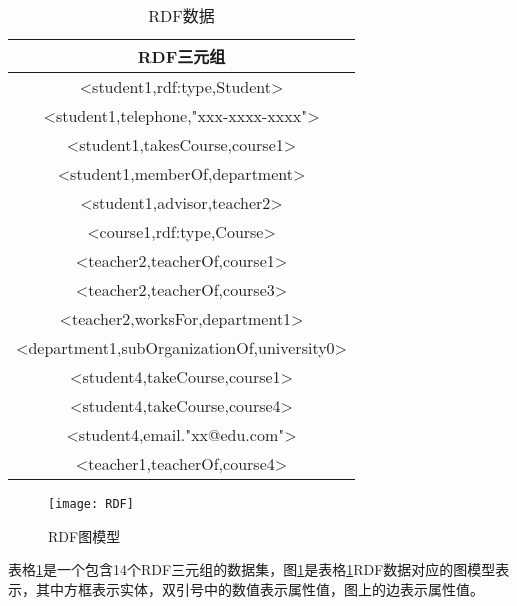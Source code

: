 \begin{table}[htbp]
    \caption[table1]{RDF数据}
    \label{RDF1}
    \vspace{0.5em}\centering\wuhao
    \begin{tabular}{|c|}
    \toprule[1.5pt]
    RDF三元组\\
    \midrule[1pt]    
    <student1,rdf:type,Student>\\
    <student1,telephone,"xxx-xxxx-xxxx">\\
    <student1,takesCourse,course1>\\
    <student1,memberOf,department>\\
    <student1,advisor,teacher2>\\
    <course1,rdf:type,Course>\\
    <teacher2,teacherOf,course1>\\
    <teacher2,teacherOf,course3>\\
    <teacher2,worksFor,department1>\\
    <department1,subOrganizationOf,university0>\\
    <student4,takeCourse,course1>\\
    <student4,takeCourse,course4>\\
    <student4,email."xx@edu.com">\\
    <teacher1,teacherOf,course4>\\
    \bottomrule[1.5pt]
    \end{tabular}
\end{table}

\begin{figure}[h]
    \centering
    \texttt{[image: RDF]}
    \caption{RDF图模型}
    \label{RDFPhoto}
\end{figure}

表格\ref{RDF1}是一个包含14个RDF三元组的数据集，图\ref{RDFPhoto}是表格\ref{RDF1}RDF数据对应的图模型表示，其中方框表示实体，双引号中的数值表示属性值，图上的边表示属性值。


